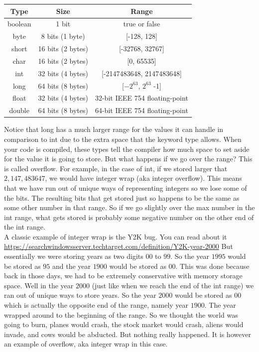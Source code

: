 \documentclass[11]{article}
\begin{document}
\begin{center}
  \begin{tabular}{ | c | c | c | }
    \hline
    Type & Size & Range \\ \hline
    boolean & 1 bit & true or false \\ \hline
    byte & 8 bits (1 byte) & [-128, 128] \\  \hline
    short & 16 bits (2 bytes) & [-32768, 32767] \\ \hline
    char & 16 bits (2 bytes) & [0, 65535] \\ \hline
    int & 32 bits (4 bytes) & [-2147483648, 2147483648] \\ \hline
    long & 64 bits (8 bytes) & [$-2^{63}$, $2^{63}$ -1] \\ \hline
    float & 32 bits (4 bytes) & 32-bit IEEE 754 floating-point \\ \hline
    double & 64 bits (8 bytes) & 64-bit IEEE 754 floating-point\\
    \hline
  \end{tabular}
\end{center}

Notice that long has a much larger range for the values it can handle in comparison to int due to the extra space that the keyword type allows. When your code is compiled, these types tell the compiler how much space to set aside for the value it is going to store. But what happens if we go over the range? This is called overflow. For example, in the case of int, if we stored larger that $2,147,483647$, we would have integer wrap (aka integer overflow). This means that we have run out of unique ways of representing integers so we lose some of the bits. The resulting bits that get stored just so happens to be the same as some other number in that range. So if we go slightly over the max number in the int range, what gets stored is probably some negative number on the other end of the int range. \\

A classic example of integer wrap is the Y2K bug. You can read about it \url{https://searchwindowsserver.techtarget.com/definition/Y2K-year-2000} But essentially we were storing years as two digits $00$ to $99$. So the year $1995$ would be stored as $95$ and the year $1900$ would be stored as $00$. This was done because back in those days, we had to be extremely conservative with memory storage space. Well in the year $2000$ (just like when we reach the end of the int range) we ran out of unique ways to store years. So the year $2000$ would be stored as $00$ which is actually the opposite end of the range, namely year $1900$. The year wrapped around to the beginning of the range. So we thought the world was going to burn, planes would crash, the stock market would crash, aliens would invade, and cows would be abducted. But nothing really happened. It is however an example of overflow, aka integer wrap in this case. \\
\end{document}
